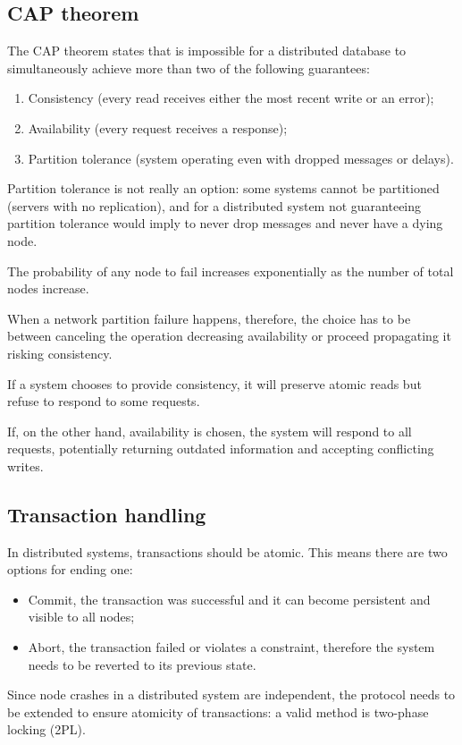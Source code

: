\subsection{CAP theorem}
The CAP theorem states that is impossible for a distributed database to simultaneously achieve more than two of the following guarantees:
\begin{enumerate}
	\item Consistency (every read receives either the most recent write or an error);
	\item Availability (every request receives a response);
	\item Partition tolerance (system operating even with dropped messages or delays).
\end{enumerate}
Partition tolerance is not really an option: some systems cannot be partitioned (servers with no replication), and for a distributed system not guaranteeing partition tolerance would imply to never drop messages and never have a dying node.

The probability of any node to fail increases exponentially as the number of total nodes increase.

When a network partition failure happens, therefore, the choice has to be between canceling the operation decreasing availability or proceed propagating it risking consistency.

If a system chooses to provide consistency, it will preserve atomic reads but refuse to respond to some requests.

If, on the other hand, availability is chosen, the system will respond to all requests, potentially returning outdated information and accepting conflicting writes. 

\subsection{Transaction handling}
In distributed systems, transactions should be atomic. This means there are two options for ending one:
\begin{itemize}
	\item Commit, the transaction was successful and it can become persistent and visible to all nodes;
	\item Abort, the transaction failed or violates a constraint, therefore the system needs to be reverted to its previous state.
\end{itemize}
Since node crashes in a distributed system are independent, the protocol needs to be extended to ensure atomicity of transactions: a valid method is two-phase locking (2PL). 

